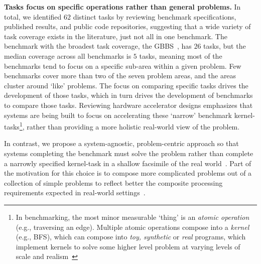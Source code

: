 \textbf{Tasks focus on specific operations rather than general problems.}
In total, we identified $62$ distinct \gai tasks by reviewing benchmark specifications, published results, and public code repositories, suggesting that a wide variety of task coverage exists in the literature, just not all in one benchmark.
The benchmark with the broadest task coverage, the \ac{GBBS}~\cite{Dhulipala2021}, has $26$ tasks, but the median coverage across all benchmarks is $5$ tasks, meaning most of the benchmarks tend to focus on a specific sub-area within a given \gai problem.
Few benchmarks cover more than two of the seven \gai problem areas, and the areas cluster around `like' problems.
The focus on comparing specific tasks drives the development of those tasks, which in turn drives the development of benchmarks to compare those tasks. 
Reviewing hardware accelerator designs emphasizes that systems are being built to focus on accelerating these `narrow' benchmark kernel-tasks\footnote{In benchmarking, the most minor measurable `thing' is an \textit{atomic operation} (e.g., traversing an edge). 
Multiple atomic operations compose into a \textit{kernel} (e.g., \ac{BFS}), which can compose into \textit{toy, synthetic} or \textit{real} programs, which implement kernels to solve some higher level problem at varying levels of scale and realism~\cite{Saavedra1996}}, rather than providing a more holistic real-world view of the problem. 

In contrast, we propose a system-agnostic, problem-centric approach so that systems completing the benchmark must solve the problem rather than complete a narrowly specified kernel-task in a shallow facsimile of the real world~\cite{Hennessy2019}.
Part of the motivation for this choice is to compose more complicated problems out of a collection of simple problems to reflect better the composite processing requirements expected in real-world settings~\cite{Regli2022a}.

